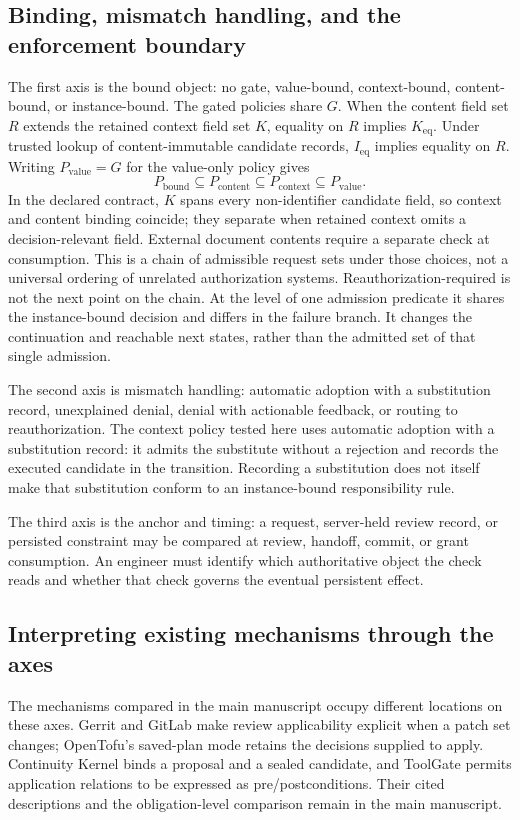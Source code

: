 \subsection{Binding, mismatch handling, and the enforcement boundary}
The first axis is the bound object: no gate, value-bound, context-bound, content-bound, or instance-bound. The gated policies share $G$. When the content field set $R$ extends the retained context field set $K$, equality on $R$ implies $K_{\mathrm{eq}}$. Under trusted lookup of content-immutable candidate records, $I_{\mathrm{eq}}$ implies equality on $R$. Writing $P_{\mathrm{value}}=G$ for the value-only policy gives
\[
 P_{\mathrm{bound}}\subseteq P_{\mathrm{content}}\subseteq P_{\mathrm{context}}\subseteq P_{\mathrm{value}}.
\]
In the declared contract, $K$ spans every non-identifier candidate field, so context and content binding coincide; they separate when retained context omits a decision-relevant field. External document contents require a separate check at consumption. This is a chain of admissible request sets under those choices, not a universal ordering of unrelated authorization systems. Reauthorization-required is not the next point on the chain. At the level of one admission predicate it shares the instance-bound decision and differs in the failure branch. It changes the continuation and reachable next states, rather than the admitted set of that single admission.

The second axis is mismatch handling: automatic adoption with a substitution record, unexplained denial, denial with actionable feedback, or routing to reauthorization. The context policy tested here uses automatic adoption with a substitution record: it admits the substitute without a rejection and records the executed candidate in the transition. Recording a substitution does not itself make that substitution conform to an instance-bound responsibility rule.

The third axis is the anchor and timing: a request, server-held review record, or persisted constraint may be compared at review, handoff, commit, or grant consumption. An engineer must identify which authoritative object the check reads and whether that check governs the eventual persistent effect.

\subsection{Interpreting existing mechanisms through the axes}
The mechanisms compared in the main manuscript occupy different locations on these axes. Gerrit and GitLab make review applicability explicit when a patch set changes; OpenTofu's saved-plan mode retains the decisions supplied to apply. Continuity Kernel binds a proposal and a sealed candidate, and ToolGate permits application relations to be expressed as pre/postconditions. Their cited descriptions and the obligation-level comparison remain in the main manuscript.

